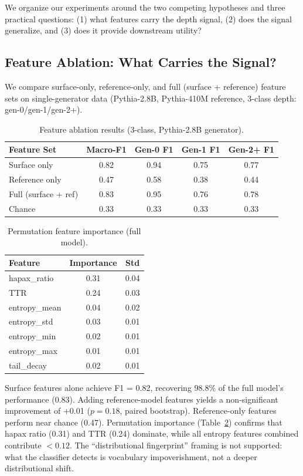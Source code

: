 \documentclass[letterpaper]{article}
\begin{document}
We organize our experiments around the two competing hypotheses and three practical questions: (1) what features carry the depth signal, (2) does the signal generalize, and (3) does it provide downstream utility?

\subsection{Feature Ablation: What Carries the Signal?}
\label{sec:ablation}

We compare surface-only, reference-only, and full (surface + reference) feature sets on single-generator data (Pythia-2.8B, Pythia-410M reference, 3-class depth: gen-0/gen-1/gen-2+).

\begin{table}[h]
\centering
\caption{Feature ablation results (3-class, Pythia-2.8B generator).}
\label{tab:ablation}
\begin{tabular}{lcccc}
\toprule
Feature Set & Macro-F1 & Gen-0 F1 & Gen-1 F1 & Gen-2+ F1 \\
\midrule
Surface only & 0.82 & 0.94 & 0.75 & 0.77 \\
Reference only & 0.47 & 0.58 & 0.38 & 0.44 \\
Full (surface + ref) & 0.83 & 0.95 & 0.76 & 0.78 \\
Chance & 0.33 & 0.33 & 0.33 & 0.33 \\
\bottomrule
\end{tabular}
\end{table}

\begin{table}[h]
\centering
\caption{Permutation feature importance (full model).}
\label{tab:importance}
\begin{tabular}{lcc}
\toprule
Feature & Importance & Std \\
\midrule
hapax\_ratio & 0.31 & 0.04 \\
TTR & 0.24 & 0.03 \\
entropy\_mean & 0.04 & 0.02 \\
entropy\_std & 0.03 & 0.01 \\
entropy\_min & 0.02 & 0.01 \\
entropy\_max & 0.01 & 0.01 \\
tail\_decay & 0.02 & 0.01 \\
\bottomrule
\end{tabular}
\end{table}

Surface features alone achieve F1 = 0.82, recovering 98.8\% of the full model's performance (0.83). Adding reference-model features yields a non-significant improvement of +0.01 ($p = 0.18$, paired bootstrap). Reference-only features perform near chance (0.47). Permutation importance (Table~\ref{tab:importance}) confirms that hapax ratio (0.31) and TTR (0.24) dominate, while all entropy features combined contribute $< 0.12$. The ``distributional fingerprint'' framing is not supported: what the classifier detects is vocabulary impoverishment, not a deeper distributional shift.
\end{document}

